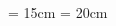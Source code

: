 \documentclass[twoside, landscape]{report}
\begin{document}
\pdfpageheight = 15cm
\pdfpagewidth = 20cm

\begin{figure}
\begin{rotate}{15}
\textcolor{DarkBlue}{\large\lipsum[1]}
\end{rotate}
\end{figure}
\end{document}

